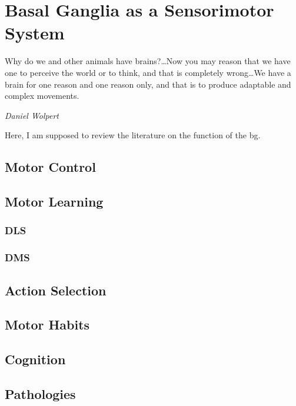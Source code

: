 \section{Basal Ganglia as a Sensorimotor System}
\label{intro:BGMotor}
\epigraph{Why do we and other animals have brains?\ldots Now you may reason that we have one to perceive the world or to think, and that is completely wrong\ldots We have a brain for one reason and one reason only, and that is to produce adaptable and complex movements.}
{\textit{Daniel Wolpert}}
\noindent

Here, I am supposed to review the literature on the function of the \gls{bg}.

\subsection{Motor Control} \label{intro:motorControl}
\subsection{Motor Learning} \label{intro:motorLearning}
\subsubsection{DLS}
\subsubsection{DMS}
\subsection{Action Selection} \label{intro:actionSelection}
\subsection{Motor Habits} \label{intro:motorHabits}
\subsection{Cognition} \label{intro:bgCognition}






\subsection{Pathologies}
\label{intro:Motor:pathologies}
